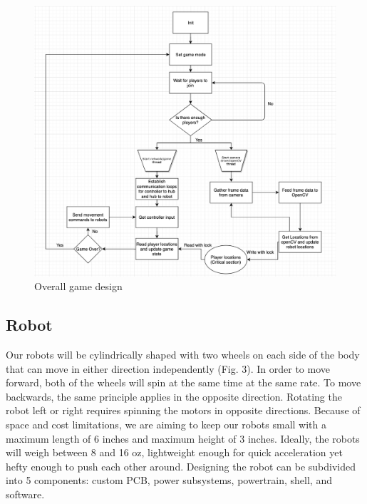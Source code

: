 \documentclass[11pt]{ieeeconf}
\begin{document}
 \begin{figure}[!t]
  \centering
  \captionsetup{justification=centering}
      \includegraphics[width=14cm]{images/Flowchart.png}
        \caption{Overall game design}
        \label{Illustration}
\end{figure}

\subsection{Robot}
Our robots will be cylindrically shaped with two wheels on each side of the body that can move in either direction independently (Fig. 3). In order to move forward, both of the wheels will spin at the same time at the same rate. To move backwards, the same principle applies in the opposite direction. Rotating the robot left or right requires spinning the motors in opposite directions. Because of space and cost limitations, we are aiming to keep our robots small with a maximum length of 6 inches and maximum height of 3 inches. Ideally, the robots will weigh between 8 and 16 oz, lightweight enough for quick acceleration yet hefty enough to push each other around. Designing the robot can be subdivided into 5 components: custom PCB, power subsystems, powertrain, shell, and software.
\end{document}

